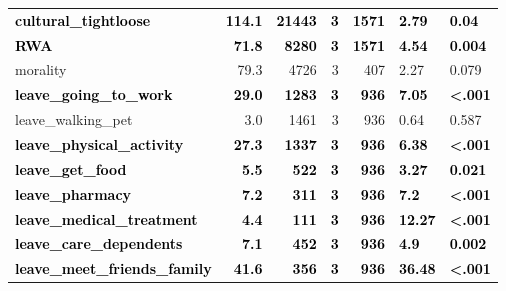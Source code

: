 \documentclass[]{article}
\begin{document}
\begin{table}[H]
\begin{tabular}[t]{lrrrrll}
\textcolor{black}{\textbf{cultural\_tightloose}} & \textcolor{black}{\textbf{114.1}} & \textcolor{black}{\textbf{21443}} & \textcolor{black}{\textbf{3}} & \textcolor{black}{\textbf{1571}} & \textcolor{black}{\textbf{2.79}} & \textcolor{black}{\textbf{0.04}}\\
\textcolor{black}{\textbf{RWA}} & \textcolor{black}{\textbf{71.8}} & \textcolor{black}{\textbf{8280}} & \textcolor{black}{\textbf{3}} & \textcolor{black}{\textbf{1571}} & \textcolor{black}{\textbf{4.54}} & \textcolor{black}{\textbf{0.004}}\\
morality & 79.3 & 4726 & 3 & 407 & 2.27 & 0.079\\
\addlinespace
\textcolor{black}{\textbf{leave\_going\_to\_work}} & \textcolor{black}{\textbf{29.0}} & \textcolor{black}{\textbf{1283}} & \textcolor{black}{\textbf{3}} & \textcolor{black}{\textbf{936}} & \textcolor{black}{\textbf{7.05}} & \textcolor{black}{\textbf{<.001}}\\
leave\_walking\_pet & 3.0 & 1461 & 3 & 936 & 0.64 & 0.587\\
\textcolor{black}{\textbf{leave\_physical\_activity}} & \textcolor{black}{\textbf{27.3}} & \textcolor{black}{\textbf{1337}} & \textcolor{black}{\textbf{3}} & \textcolor{black}{\textbf{936}} & \textcolor{black}{\textbf{6.38}} & \textcolor{black}{\textbf{<.001}}\\
\textcolor{black}{\textbf{leave\_get\_food}} & \textcolor{black}{\textbf{5.5}} & \textcolor{black}{\textbf{522}} & \textcolor{black}{\textbf{3}} & \textcolor{black}{\textbf{936}} & \textcolor{black}{\textbf{3.27}} & \textcolor{black}{\textbf{0.021}}\\
\textcolor{black}{\textbf{leave\_pharmacy}} & \textcolor{black}{\textbf{7.2}} & \textcolor{black}{\textbf{311}} & \textcolor{black}{\textbf{3}} & \textcolor{black}{\textbf{936}} & \textcolor{black}{\textbf{7.2}} & \textcolor{black}{\textbf{<.001}}\\
\addlinespace
\textcolor{black}{\textbf{leave\_medical\_treatment}} & \textcolor{black}{\textbf{4.4}} & \textcolor{black}{\textbf{111}} & \textcolor{black}{\textbf{3}} & \textcolor{black}{\textbf{936}} & \textcolor{black}{\textbf{12.27}} & \textcolor{black}{\textbf{<.001}}\\
\textcolor{black}{\textbf{leave\_care\_dependents}} & \textcolor{black}{\textbf{7.1}} & \textcolor{black}{\textbf{452}} & \textcolor{black}{\textbf{3}} & \textcolor{black}{\textbf{936}} & \textcolor{black}{\textbf{4.9}} & \textcolor{black}{\textbf{0.002}}\\
\textcolor{black}{\textbf{leave\_meet\_friends\_family}} & \textcolor{black}{\textbf{41.6}} & \textcolor{black}{\textbf{356}} & \textcolor{black}{\textbf{3}} & \textcolor{black}{\textbf{936}} & \textcolor{black}{\textbf{36.48}} & \textcolor{black}{\textbf{<.001}}\\

\end{tabular}
\end{table}
\end{document}
